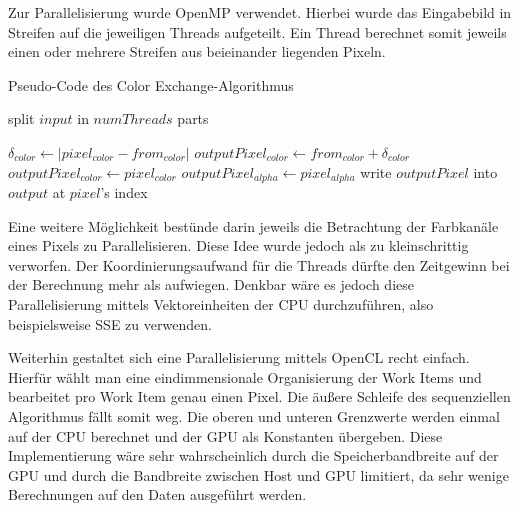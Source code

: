\documentclass[10pt,a4paper]{article}
\providecommand{\abs}[1]{\lvert#1\rvert}
\begin{document}
Zur Parallelisierung wurde OpenMP verwendet. Hierbei wurde das Eingabebild in Streifen auf die jeweiligen Threads aufgeteilt. Ein Thread berechnet somit jeweils einen oder mehrere Streifen aus beieinander liegenden Pixeln.

\begin{algorithm}[H]
\caption{Pseudo-Code des \glqq Color Exchange\grqq-Algorithmus}
\label{algo:exchange_par}
\begin{algorithmic}[1]
\State split $input$ in $numThreads$ parts
  
      \State $\delta_{color} \gets \abs{ pixel_{color} - from_{color}}$    
        \State $outputPixel_{color} \gets from_{color} + \delta_{color}$
      \Else
        \State $outputPixel_{color} \gets pixel_{color}$
      \EndIf
    \EndFor
    \State $outputPixel_{alpha} \gets pixel_{alpha}$
    \State write $outputPixel$ into $output$ at $pixel$'s index 
  \EndFor
\EndFor
\end{algorithmic}
\end{algorithm}
 
Eine weitere Möglichkeit bestünde darin jeweils die Betrachtung der Farbkanäle eines Pixels zu Parallelisieren. Diese Idee wurde jedoch als zu kleinschrittig verworfen. Der Koordinierungsaufwand für die Threads dürfte den Zeitgewinn bei der Berechnung mehr als aufwiegen. Denkbar wäre es jedoch diese Parallelisierung mittels Vektoreinheiten der CPU durchzuführen, also beispielsweise SSE zu verwenden.

Weiterhin gestaltet sich eine Parallelisierung mittels OpenCL recht einfach. Hierfür wählt man eine eindimmensionale Organisierung der Work Items und bearbeitet pro Work Item genau einen Pixel. Die äußere Schleife des sequenziellen Algorithmus fällt somit weg. Die oberen und unteren Grenzwerte werden einmal auf der CPU berechnet und der GPU als Konstanten übergeben. Diese Implementierung wäre sehr wahrscheinlich durch die Speicherbandbreite auf der GPU und durch die Bandbreite zwischen Host und GPU limitiert, da sehr wenige Berechnungen auf den Daten ausgeführt werden.








\end{document}
